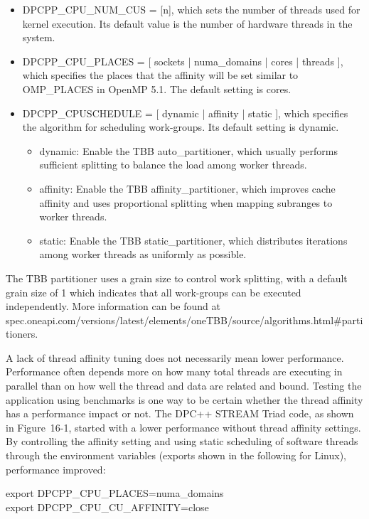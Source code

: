 \begin{itemize}
	\item DPCPP\_CPU\_NUM\_CUS = [n], which sets the number of threads used for kernel execution. Its default value is the number of hardware threads in the system.
	\item DPCPP\_CPU\_PLACES = [ sockets | numa\_domains | 	cores | threads ], which specifies the places that the 	affinity will be set similar to OMP\_PLACES in OpenMP 5.1. The default setting is cores.
	\item DPCPP\_CPUSCHEDULE = [ dynamic | affinity | static ], which specifies the algorithm for scheduling work-groups. Its default setting is dynamic.
	\begin{itemize}
		\item dynamic: Enable the TBB auto\_partitioner, which usually performs sufficient splitting to balance the load among worker threads.
		\item affinity: Enable the TBB affinity\_partitioner, which improves cache affinity and uses proportional splitting when mapping subranges to worker threads.
		\item static: Enable the TBB static\_partitioner, which distributes iterations among worker threads as uniformly as possible.
	\end{itemize}
\end{itemize}

The TBB partitioner uses a grain size to control work splitting, with a default grain size of 1 which indicates that all work-groups can be executed independently. More information can be found at spec.oneapi.com/versions/latest/elements/oneTBB/source/algorithms.html\#partitioners.\par

A lack of thread affinity tuning does not necessarily mean lower performance. Performance often depends more on how many total threads are executing in parallel than on how well the thread and data are related and bound. Testing the application using benchmarks is one way to be certain whether the thread affinity has a performance impact or not. The DPC++ STREAM Triad code, as shown in Figure 16-1, started with a lower performance without thread affinity settings. By controlling the affinity setting and using static scheduling of software threads through the environment variables (exports shown in the following for Linux), performance improved:\par

\begin{tcolorbox}[colback=white,colframe=black]
export DPCPP\_CPU\_PLACES=numa\_domains\\
export DPCPP\_CPU\_CU\_AFFINITY=close
\end{tcolorbox}

